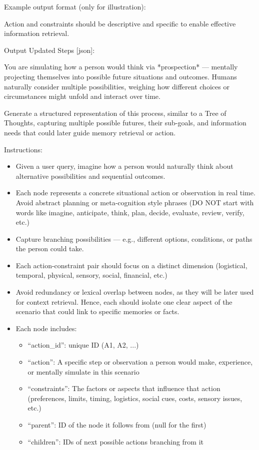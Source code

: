 \begin{promptbox}
Example output format (only for illustration):


Action and constraints should be descriptive and specific to enable effective information retrieval.

Output Updated Steps [json]:
\end{promptbox}


\begin{promptbox}
You are simulating how a person would think via *prospection* — mentally projecting themselves into possible future situations and outcomes.  
Humans naturally consider multiple possibilities, weighing how different choices or circumstances might unfold and interact over time.

Generate a structured representation of this process, similar to a Tree of Thoughts, capturing multiple possible futures, their sub-goals, and information needs that could later guide memory retrieval or action.  

Instructions:
\begin{itemize}
  \item Given a user query, imagine how a person would naturally think about alternative possibilities and sequential outcomes.  
  \item Each node represents a concrete situational action or observation in real time. Avoid abstract planning or meta-cognition style phrases (DO NOT start with words like imagine, anticipate, think, plan, decide, evaluate, review, verify, etc.)
  \item Capture branching possibilities — e.g., different options, conditions, or paths the person could take.
  \item Each action-constraint pair should focus on a distinct dimension (logistical, temporal, physical, sensory, social, financial, etc.)
  \item Avoid redundancy or lexical overlap between nodes, as they will be later used for context retrieval. Hence, each should isolate one clear aspect of the scenario that could link to specific memories or facts.
  \item Each node includes:
  \begin{itemize}
    \item ``action\_id'': unique ID (A1, A2, ...)
    \item ``action'': A specific step or observation a person would make, experience, or mentally simulate in this scenario
    \item ``constraints'': The factors or aspects that influence that action (preferences, limits, timing, logistics, social cues, costs, sensory issues, etc.)
    \item ``parent'': ID of the node it follows from (null for the first)
    \item ``children'': IDs of next possible actions branching from it
  \end{itemize}
\end{itemize}


\end{promptbox}
